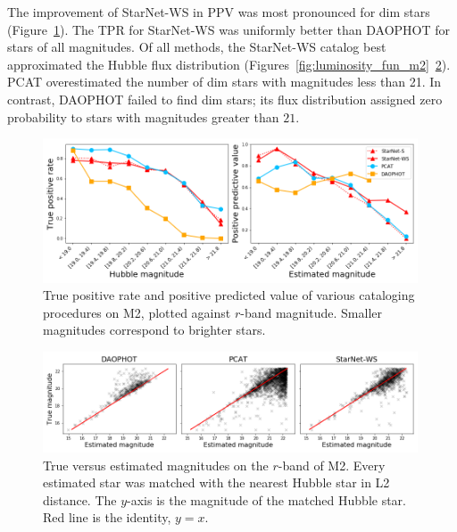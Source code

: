 

The improvement of StarNet-WS in PPV was most pronounced for dim stars (Figure~\ref{fig:summary_stats}). The TPR for StarNet-WS was uniformly better than DAOPHOT for stars of all magnitudes. 
Of all methods, the StarNet-WS catalog best approximated the Hubble flux distribution (Figures~\ref{fig:luminosity_fun_m2}~\ref{fig:m2_flux_estimation}). 
PCAT overestimated the number of dim stars with magnitudes less than 21. 
In contrast, DAOPHOT failed to find dim stars; its flux distribution assigned zero probability to stars with magnitudes greater than $21$.

\begin{figure}[ht]
    \centering
    \includegraphics[width=0.99\textwidth]{figures/summary_statistics_m2.png}
    \caption{True positive rate and positive predicted value of various cataloging
    procedures on M2, plotted against $r$-band magnitude.
    Smaller magnitudes correspond to brighter stars.
    }
    \label{fig:summary_stats}
\end{figure}

\begin{figure}[ht]
    \centering
    \includegraphics[width=0.99\textwidth]{figures/m2_flux_estimation.png}
    \caption{True versus estimated magnitudes on the $r$-band of M2. 
    Every estimated star was matched with the nearest Hubble star in L2 distance. The $y$-axis is the magnitude of the matched Hubble star. Red line is the identity, $y=x$. }
    \label{fig:m2_flux_estimation}
\end{figure}

